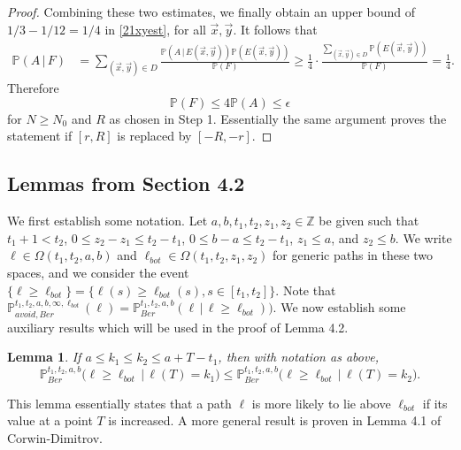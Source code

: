 \documentclass[12pt]{article}
\newtheorem{lemma}{Lemma}
\begin{document}
\begin{proof}
	Combining these two estimates, we finally obtain an upper bound of $1/3 - 1/12 = 1/4$ in \eqref{21xyest}, for all $\vec{x},\vec{y}$. It follows that
	\begin{align*}
	\mathbb{P}(A\,|\,F) &= \sum_{(\vec{x},\vec{y})\in D} \frac{\mathbb{P}(A\,|\,E(\vec{x},\vec{y}))\mathbb{P}(E(\vec{x},\vec{y}))}{\mathbb{P}(F)} \geq \frac{1}{4}\cdot\frac{\sum_{(\vec{x},\vec{y})\in D} \mathbb{P}(E(\vec{x},\vec{y}))}{\mathbb{P}(F)} = \frac{1}{4}.
	\end{align*}
	Therefore
	\[
	\mathbb{P}(F) \leq 4\mathbb{P}(A) \leq \epsilon
	\]
	for $N\geq N_0$ and $R$ as chosen in Step 1. Essentially the same argument proves the statement if $[r,R]$ is replaced by $[-R,-r]$.
	
	\end{proof}


\subsection*{Lemmas from Section 4.2}

	
	We first establish some notation. Let $a,b,t_1,t_2,z_1,z_2 \in \mathbb{Z}$ be given such that $t_1 + 1 < t_2$, $0\leq z_2 - z_1 \leq t_2 - t_1$, $0\leq b-a \leq t_2 - t_1$, $z_1\leq a$, and $z_2\leq b$. We write $\ell\in\Omega(t_1,t_2,a,b)$ and $\ell_{bot}\in\Omega(t_1,t_2,z_1,z_2)$ for generic paths in these two spaces, and we consider the event $\{\ell \geq \ell_{bot}\} = \{\ell(s) \geq \ell_{bot}(s), s\in[t_1,t_2]\}$. Note that $\mathbb{P}^{t_1,t_2,a,b,\infty,\ell_{bot}}_{avoid,Ber}(\ell) = \mathbb{P}^{t_1,t_2,a,b}_{Ber}(\ell\,|\,\ell \geq \ell_{bot}))$. We now establish some auxiliary results which will be used in the proof of Lemma 4.2.
	
	\begin{lemma}\label{pathcounting}
		If $a\leq k_1\leq k_2\leq a + T - t_1$, then with notation as above,
		\[
		\mathbb{P}^{t_1, t_2, a, b}_{Ber}\big( \ell \geq \ell_{bot}\,\big|\,\ell(T) = k_1\big) \leq \mathbb{P}^{t_1, t_2, a, b}_{Ber}\big(\ell \geq \ell_{bot}\,\big|\,\ell(T) = k_2\big).
		\]
	\end{lemma}

	\begin{remark}
		This lemma essentially states that a path $\ell$ is more likely to lie above $\ell_{bot}$ if its value at a point $T$ is increased. A more general result is proven in Lemma 4.1 of Corwin-Dimitrov.
	\end{remark}
\end{document}
